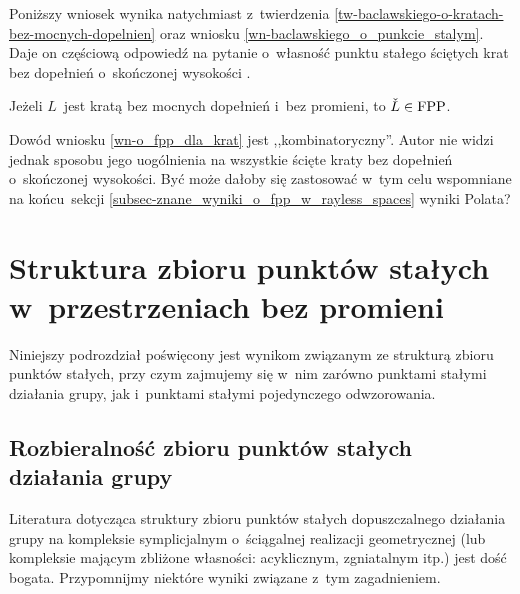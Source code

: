 Poniższy wniosek wynika natychmiast z~twierdzenia \ref{tw-baclawskiego-o-kratach-bez-mocnych-dopelnien} oraz wniosku \ref{wn-baclawskiego_o_punkcie_stalym}. Daje on częściową odpowiedź na pytanie o~własność punktu stałego ściętych krat bez dopełnień o~skończonej wysokości \cite[s.~98]{Bjorner81}. 

\begin{wn}\label{wn-o_fpp_dla_krat}
Jeżeli $L$~jest kratą bez mocnych dopełnień i~bez promieni, to $\check{L}\in\mathrm{FPP}$.
\end{wn}

Dowód wniosku \ref{wn-o_fpp_dla_krat} jest ,,kombinatoryczny''. Autor nie widzi  jednak sposobu jego uogólnienia na wszystkie ścięte kraty bez dopełnień o~skończonej wysokości. Być może dałoby się zastosować w~tym celu wspomniane na końcu~sekcji \ref{subsec-znane_wyniki_o_fpp_w_rayless_spaces} wyniki Polata?




\section[Struktura zbioru punktów stałych]{Struktura zbioru punktów stałych w~przestrzeniach bez promieni}\label{sec-struktura_zbioru_fixpunktow_bez_promieni}
Niniejszy podrozdział poświęcony jest wynikom związanym ze strukturą zbioru punktów stałych, przy czym zajmujemy się w~nim zarówno punktami stałymi działania grupy, jak i~punktami stałymi pojedynczego odwzorowania. 



\subsection{Rozbieralność zbioru punktów stałych działania grupy}
Literatura dotycząca struktury zbioru punktów stałych dopuszczalnego działania grupy na kompleksie symplicjalnym o~ściągalnej realizacji geometrycznej (lub kompleksie mającym zbliżone własności: acyklicznym, zgniatalnym itp.) jest dość bogata. Przypomnijmy niektóre wyniki związane z~tym zagadnieniem.

